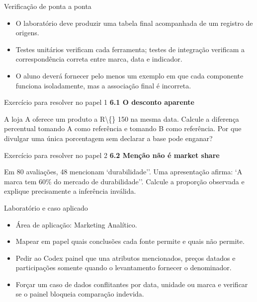 \documentclass[10pt,aspectratio=169]{beamer}
\begin{document}
\begin{frame}[t]{Verificação de ponta a ponta}
\small
\begin{itemize}
\item O laboratório deve produzir uma tabela final acompanhada de um registro de origens.
\item Testes unitários verificam cada ferramenta; testes de integração verificam a correspondência correta entre marca, data e indicador.
\item O aluno deverá fornecer pelo menos um exemplo em que cada componente funciona isoladamente, mas a associação final é incorreta.
\end{itemize}
\end{frame}

\begin{frame}[t]{Exercício para resolver no papel 1}
\small
\small\textbf{6.1 O desconto aparente}\par\vspace{4mm}A loja A oferece um produto a R\textbackslash\{\} 150 na mesma data. Calcule a diferença percentual tomando A como referência e tomando B como referência. Por que divulgar uma única porcentagem sem declarar a base pode enganar?
\end{frame}

\begin{frame}[t]{Exercício para resolver no papel 2}
\small
\small\textbf{6.2 Menção não é market share}\par\vspace{4mm}Em 80 avaliações, 48 mencionam `durabilidade''. Uma apresentação afirma: `A marca tem 60\% do mercado de durabilidade''. Calcule a proporção observada e explique precisamente a inferência inválida.
\end{frame}

\begin{frame}[t]{Laboratório e caso aplicado}
\small
\begin{itemize}
\item Área de aplicação: Marketing Analítico.
\item Mapear em papel quais conclusões cada fonte permite e quais não permite.
\item Pedir ao Codex painel que una atributos mencionados, preços datados e participações somente quando o levantamento fornecer o denominador.
\item Forçar um caso de dados conflitantes por data, unidade ou marca e verificar se o painel bloqueia comparação indevida.
\end{itemize}
\end{frame}
\end{document}
